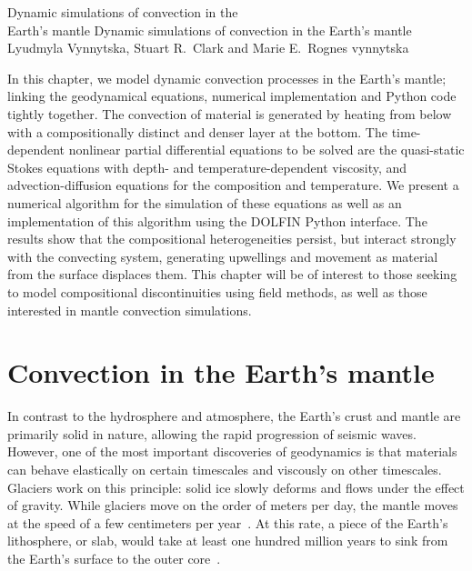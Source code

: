               {Dynamic simulations of convection in the \\ Earth's mantle}
              {Dynamic simulations of convection in the Earth's mantle}
              {Lyudmyla Vynnytska,  Stuart R.~Clark and Marie E.~Rognes}
              {vynnytska}

In this chapter, we model dynamic convection processes in the Earth's
mantle; linking the geodynamical equations, numerical implementation and
Python code tightly together. The convection of material is generated by
heating from below with a compositionally distinct and denser layer at
the bottom.  The time-dependent nonlinear partial differential equations
to be solved are the quasi-static Stokes equations with depth- and
temperature-dependent viscosity, and advection-diffusion equations for
the composition and temperature.  We present a numerical algorithm for
the simulation of these equations as well as an implementation of this
algorithm using the DOLFIN Python interface.  The results show that the
compositional heterogeneities persist, but interact strongly with the
convecting system, generating upwellings and movement as material from
the surface displaces them. This chapter will be of interest to those
seeking to model compositional discontinuities using field methods,
as well as those interested in mantle convection simulations.

\section{Convection in the Earth's mantle}

In contrast to the hydrosphere and atmosphere, the Earth's crust and
mantle are primarily solid in nature, allowing the rapid progression
of seismic waves.  However, one of the most important discoveries
of geodynamics is that materials can behave elastically on certain
timescales and viscously on other timescales. Glaciers work on this
principle: solid ice slowly deforms and flows under the effect of gravity.
While glaciers move on the order of meters per day, the mantle moves
at the speed of a few centimeters per year~\citep{vanderMeer2010}.
At this rate, a piece of the Earth's lithosphere, or slab, would take
at least one hundred million years to sink from the Earth's surface to
the outer core~\citep{Jarvis2007}.

